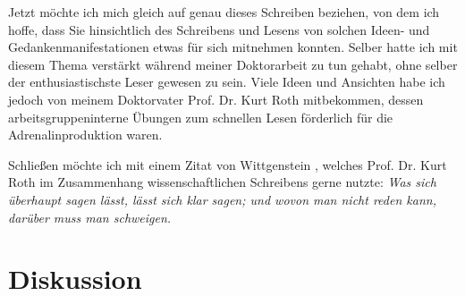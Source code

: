\documentclass[10pt,twocolumn]{scrartcl}
\begin{document}
Jetzt möchte ich mich gleich auf genau dieses Schreiben beziehen, 
von dem ich hoffe, dass Sie hinsichtlich des Schreibens und Lesens 
von solchen Ideen- und Gedankenmanifestationen etwas für sich mitnehmen konnten. 
Selber hatte ich mit diesem Thema verstärkt während meiner Doktorarbeit \cite{Gerhards2008} 
zu tun gehabt, ohne selber der enthusiastischste Leser gewesen zu sein.
Viele Ideen und Ansichten habe ich jedoch von meinem Doktorvater 
Prof. Dr. Kurt Roth mitbekommen, dessen arbeitsgruppeninterne Übungen 
zum schnellen Lesen förderlich für die Adrenalinproduktion waren.

% 


Schließen möchte ich mit einem Zitat von Wittgenstein \cite{Wittgenstein1922},
welches Prof. Dr. Kurt Roth im Zusammenhang wissenschaftlichen
Schreibens gerne nutzte: {\it Was sich überhaupt sagen lässt, lässt
sich klar sagen; und wovon man nicht reden kann, darüber muss man
schweigen.} 

\section{Diskussion}
\end{document}
